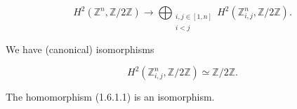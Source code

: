 \begin{equation}
  H^2(\mathbb Z^n,\mathbb Z/2\mathbb Z)
  \longrightarrow
  \bigoplus_{\substack{i,j\in[1,n]\\ i<j}}
    H^2(\mathbb Z^n_{i,j},\mathbb Z/2\mathbb Z).
  \tag{1.6.1.1}
\end{equation}

We have (canonical) isomorphisms

\begin{equation}
  H^2(\mathbb Z^n_{i,j},\mathbb Z/2\mathbb Z)
  \simeq \mathbb Z/2\mathbb Z.
  \tag{1.6.1.2}
\end{equation}

The homomorphism (1.6.1.1) is an isomorphism.
